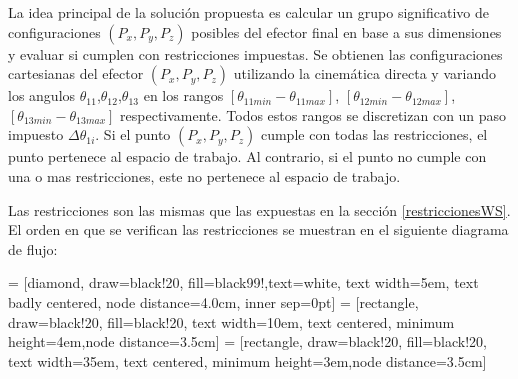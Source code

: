           \newpage     
    
     La idea principal de la solución propuesta es calcular un grupo significativo de configuraciones $(P_x,P_y,P_z)$ posibles del efector final en base a sus dimensiones y evaluar si cumplen con restricciones impuestas. Se obtienen las configuraciones cartesianas del efector $(P_x,P_y,P_z)$  utilizando la cinemática directa y variando los angulos $\theta_{11}$,$\theta_{12}$,$\theta_{13}$ en los rangos $[\theta_{11min}-\theta_{11max}]$, $[\theta_{12min}-\theta_{12max}]$, $[\theta_{13min}-\theta_{13max}]$ respectivamente. Todos estos rangos se discretizan con un paso impuesto \(  \Delta  \theta _{1i} \). Si el punto  $(P_x,P_y,P_z)$ cumple con todas las restricciones, el punto pertenece al espacio de trabajo. Al contrario, si el punto no cumple con una o mas restricciones, este no pertenece al espacio de trabajo.

    Las restricciones son las mismas que las expuestas en la sección \eqref{restriccionesWS}. El orden en que se verifican las restricciones se muestran en el siguiente diagrama de flujo:

 = [diamond, draw=black!20, fill=black99!,text=white, 
    text width=5em, text badly centered, node distance=4.0cm, inner sep=0pt]
 = [rectangle, draw=black!20, fill=black!20, 
    text width=10em, text centered,   minimum height=4em,node distance=3.5cm]
 = [rectangle, draw=black!20, fill=black!20, 
    text width=35em, text centered,   minimum height=3em,node distance=3.5cm]
    

